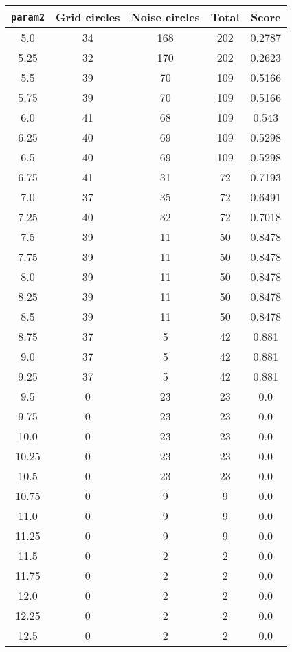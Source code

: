 \documentclass[letterpaper, 12pt]{article}
\begin{document}
\begin{longtable}{|c|c|c|c|c|}
\hline
\textbf{\texttt{param2}} & \textbf{Grid circles} & \textbf{Noise circles} & \textbf{Total} & \textbf{Score} \\
\hline
5.0 & 34 & 168 & 202 & 0.2787 \\
\hline
5.25 & 32 & 170 & 202 & 0.2623 \\
\hline
5.5 & 39 & 70 & 109 & 0.5166 \\
\hline
5.75 & 39 & 70 & 109 & 0.5166 \\
\hline
6.0 & 41 & 68 & 109 & 0.543 \\
\hline
6.25 & 40 & 69 & 109 & 0.5298 \\
\hline
6.5 & 40 & 69 & 109 & 0.5298 \\
\hline
6.75 & 41 & 31 & 72 & 0.7193 \\
\hline
7.0 & 37 & 35 & 72 & 0.6491 \\
\hline
7.25 & 40 & 32 & 72 & 0.7018 \\
\hline
7.5 & 39 & 11 & 50 & 0.8478 \\
\hline
7.75 & 39 & 11 & 50 & 0.8478 \\
\hline
8.0 & 39 & 11 & 50 & 0.8478 \\
\hline
8.25 & 39 & 11 & 50 & 0.8478 \\
\hline
8.5 & 39 & 11 & 50 & 0.8478 \\
\hline
8.75 & 37 & 5 & 42 & 0.881 \\
\hline
9.0 & 37 & 5 & 42 & 0.881 \\
\hline
9.25 & 37 & 5 & 42 & 0.881 \\
\hline
9.5 & 0 & 23 & 23 & 0.0 \\
\hline
9.75 & 0 & 23 & 23 & 0.0 \\
\hline
10.0 & 0 & 23 & 23 & 0.0 \\
\hline
10.25 & 0 & 23 & 23 & 0.0 \\
\hline
10.5 & 0 & 23 & 23 & 0.0 \\
\hline
10.75 & 0 & 9 & 9 & 0.0 \\
\hline
11.0 & 0 & 9 & 9 & 0.0 \\
\hline
11.25 & 0 & 9 & 9 & 0.0 \\
\hline
11.5 & 0 & 2 & 2 & 0.0 \\
\hline
11.75 & 0 & 2 & 2 & 0.0 \\
\hline
12.0 & 0 & 2 & 2 & 0.0 \\
\hline
12.25 & 0 & 2 & 2 & 0.0 \\
\hline
12.5 & 0 & 2 & 2 & 0.0 \\

\end{longtable}
\end{document}
